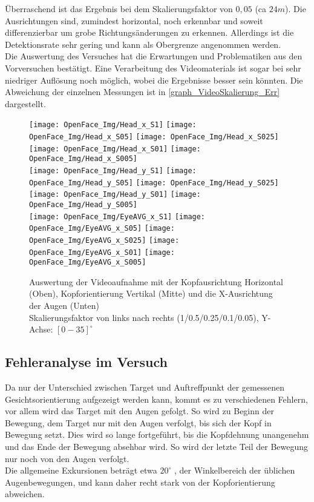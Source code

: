 Überraschend ist das Ergebnis bei dem Skalierungsfaktor von $0,05$ (ca $24m$). Die Ausrichtungen sind, zumindest horizontal, noch erkennbar und soweit differenzierbar um grobe Richtungsänderungen zu erkennen. Allerdings ist die Detektionsrate sehr gering und kann als Obergrenze angenommen werden.\\
Die Auswertung des Versuches hat die Erwartungen und Problematiken aus den Vorversuchen bestätigt. Eine Verarbeitung des Videomaterials ist sogar bei sehr niedriger Auflösung noch möglich, wobei die Ergebnisse besser sein könnten.
Die Abweichung der einzelnen Messungen ist in \autoref{graph_VideoSkalierung_Err} dargestellt.
\begin{landscape}
\begin{figure}
	\centering
	\texttt{[image: OpenFace\_Img/Head\_x\_S1]}
	\texttt{[image: OpenFace\_Img/Head\_x\_S05]}
	\texttt{[image: OpenFace\_Img/Head\_x\_S025]}
	\texttt{[image: OpenFace\_Img/Head\_x\_S01]}
	\texttt{[image: OpenFace\_Img/Head\_x\_S005]}\\	
	\texttt{[image: OpenFace\_Img/Head\_y\_S1]}
	\texttt{[image: OpenFace\_Img/Head\_y\_S05]}
	\texttt{[image: OpenFace\_Img/Head\_y\_S025]}
	\texttt{[image: OpenFace\_Img/Head\_y\_S01]}
	\texttt{[image: OpenFace\_Img/Head\_y\_S005]}\\	
	\texttt{[image: OpenFace\_Img/EyeAVG\_x\_S1]}	
	\texttt{[image: OpenFace\_Img/EyeAVG\_x\_S05]}
	\texttt{[image: OpenFace\_Img/EyeAVG\_x\_S025]}
	\texttt{[image: OpenFace\_Img/EyeAVG\_x\_S01]}
	\texttt{[image: OpenFace\_Img/EyeAVG\_x\_S005]}
	\caption{Auswertung der Videoaufnahme mit der Kopfausrichtung Horizontal (Oben), Kopforientierung Vertikal (Mitte) und die X-Ausrichtung der Augen (Unten)\\Skalierungsfaktor von links nach rechts (1/0.5/0.25/0.1/0.05), Y-Achse: $[0-35]^\circ$}
	\label{graph_VideoSkalierung}
\end{figure}
\end{landscape}
\subsection{Fehleranalyse im Versuch}
Da nur der Unterschied zwischen Target und Auftreffpunkt der gemessenen Gesichtsorientierung aufgezeigt werden kann, kommt es zu verschiedenen Fehlern, vor allem wird das Target mit den Augen gefolgt.
So wird zu Beginn der Bewegung, dem Target nur mit den Augen verfolgt, bis sich der Kopf in Bewegung setzt. Dies wird so lange fortgeführt, bis die Kopfdehnung unangenehm und das Ende der Bewegung absehbar wird. So wird der letzte Teil der Bewegung nur noch von den Augen verfolgt.\\
Die allgemeine Exkursionen beträgt etwa $20^\circ$ \cite{wiki_Gesichtsfeld}, der Winkelbereich der üblichen Augenbewegungen, und kann daher recht stark von der Kopforientierung abweichen.\\

